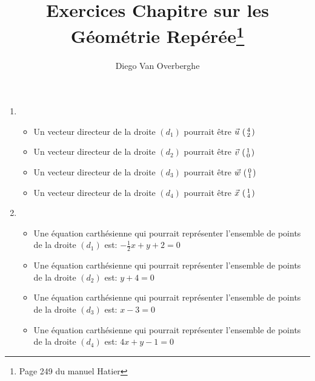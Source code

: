 \documentclass[12pt, a4paper]{article}
\begin{document}
	\title{Exercices Chapitre sur les Géométrie Repérée\footnote{Page 249 du manuel Hatier}}
	\author{Diego Van Overberghe}
	\maketitle

	\begin{Exercise}[number={5}]
		\begin{enumerate}[1)]
		   \item 	\begin{itemize}
						\item 	Un vecteur directeur de la droite $(d_1)$ pourrait être $\vec{u}\ \begin{psmallmatrix}4 \\ 2\end{psmallmatrix}$
						\item 	Un vecteur directeur de la droite $(d_2)$ pourrait être $\vec{v}\ \begin{psmallmatrix}1 \\ 0\end{psmallmatrix}$
						\item	Un vecteur directeur de la droite $(d_3)$ pourrait être $\vec{w}\ \begin{psmallmatrix}0 \\ 1\end{psmallmatrix}$
						\item	Un vecteur directeur de la droite $(d_4)$ pourrait être $\vec{x}\ \begin{psmallmatrix}1 \\ 4\end{psmallmatrix}$
					\end{itemize}
			\item	\begin{itemize}
						\item 	Une équation carthésienne qui pourrait représenter l'ensemble de points de la droite $(d_1)$ est: $-\frac{1}{2}x+y+2=0$
						\item 	Une équation carthésienne qui pourrait représenter l'ensemble de points de la droite $(d_2)$ est: $y+4=0$
						\item 	Une équation carthésienne qui pourrait représenter l'ensemble de points de la droite $(d_3)$ est: $x-3=0$
						\item 	Une équation carthésienne qui pourrait représenter l'ensemble de points de la droite $(d_4)$ est: $4x+y-1=0$
					\end{itemize}
		\end{enumerate}
	\end{Exercise}
	
\end{document}
